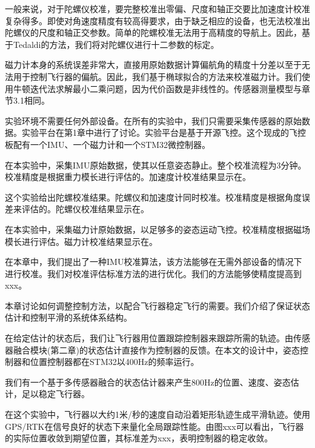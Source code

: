 \documentclass[
  type=master
]{gdutthesis}
\begin{document}
一般来说，对于陀螺仪校准，要完整校准出零偏、尺度和轴正交要比加速度计校准复杂得多。即使对角速度精度有较高得要求，由于缺乏相应的设备，也无法校准出陀螺仪的尺度和轴正交参数。简单的陀螺校准无法用于高精度的导航上。因此，基于Tedaldi的方法\cite{tedaldi2014robust}，我们将对陀螺仪进行十二参数的标定。

磁力计本身的系统误差非常大，直接用原始数据计算偏航角的精度十分差以至于无法用于控制飞行器的偏航。因此，我们基于椭球拟合的方法来校准磁力计\cite{李勇2012基于椭球拟合的三轴磁传感器误差补偿方法}。我们使用牛顿迭代法求解最小二乘问题，因为代价函数是非线性的。传感器测量模型与章节3.1相同。

实验环境不需要任何外部设备。在所有的实验中，我们只需要采集传感器的原始数据。实验平台在第1章中进行了讨论。实验平台是基于开源飞控。这个现成的飞控板配有一个IMU、一个磁力计和一个STM32微控制器。

在本实验中，采集IMU原始数据，使其以任意姿态静止。整个校准流程为3分钟。校准精度是根据重力模长进行评估的。加速度计校准结果显示在。

这个实验给出陀螺校准结果。陀螺仪和加速度计同时校准。校准精度是根据角度误差来评估的。陀螺仪校准结果显示在。

在本实验中，采集磁力计原始数据，以足够多的姿态运动飞控。校准精度根据磁场模长进行评估。磁力计校准结果显示在。

在本章中，我们提出了一种IMU校准算法，该方法能够在无需外部设备的情况下进行校准。我们对校准评估标准方法的进行优化。我们的方法能够使精度提高到xxx。

本章讨论如何调整控制方法，以配合飞行器稳定飞行的需要。我们介绍了保证状态估计和控制平滑的系统体系结构。

在给定估计的状态后，我们让飞行器用位置跟踪控制器来跟踪所需的轨迹\cite{lee2010geometric}。由传感器融合模块(第二章)的状态估计直接作为控制器的反馈。在本文的设计中，姿态控制器和位置控制器都在STM32以400Hz的频率运行。

我们有一个基于多传感器融合的状态估计器来产生800Hz的位置、速度、姿态估计，足以稳定飞行器。

在这个实验中，飞行器以大约1米/秒的速度自动沿着矩形轨迹生成平滑轨迹。使用GPS/RTK在信号良好的状态下来量化全局跟踪性能。由图xxx可以看出，飞行器的实际位置收敛到期望位置，其标准差为xxx，表明控制器的稳定收敛。
\end{document}
